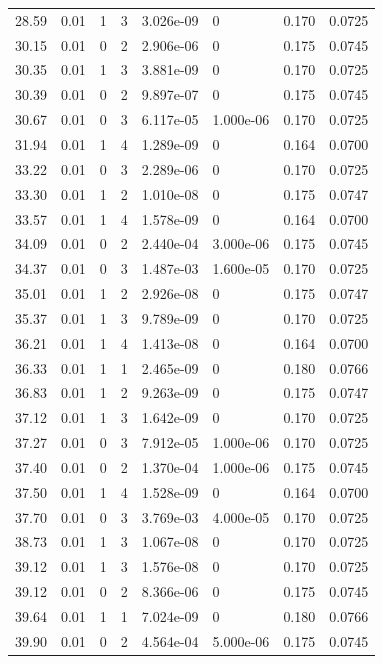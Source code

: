 \documentclass[preview]{standalone}
\begin{document}
{{{\begin{tabular}{L{1.2cm}C{1.2cm} C{0.3cm}C{0.5cm} C{1.4cm}C{1.4cm} C{1.4cm}C{1.4cm}}
  28.59  &  0.01  & 1     &  3 &  3.026e-09  & 0  & 0.170 &  0.0725   \\ 
  30.15  &  0.01  & 0     &  2 &  2.906e-06  & 0  & 0.175 &  0.0745   \\ 
  30.35  &  0.01  & 1     &  3 &  3.881e-09  & 0  & 0.170 &  0.0725   \\ 
  30.39  &  0.01  & 0     &  2 &  9.897e-07  & 0  & 0.175 &  0.0745   \\ 
  30.67  &  0.01  & 0     &  3 &  6.117e-05  & 1.000e-06  & 0.170 &  0.0725   \\ 
  31.94  &  0.01  & 1     &  4 &  1.289e-09  & 0  & 0.164 &  0.0700   \\ 
  33.22  &  0.01  & 0     &  3 &  2.289e-06  & 0  & 0.170 &  0.0725   \\ 
  33.30  &  0.01  & 1     &  2 &  1.010e-08  & 0  & 0.175 &  0.0747   \\ 
  33.57  &  0.01  & 1     &  4 &  1.578e-09  & 0  & 0.164 &  0.0700   \\ 
  34.09  &  0.01  & 0     &  2 &  2.440e-04  & 3.000e-06  & 0.175 &  0.0745   \\ 
  34.37  &  0.01  & 0     &  3 &  1.487e-03  & 1.600e-05  & 0.170 &  0.0725   \\ 
  35.01  &  0.01  & 1     &  2 &  2.926e-08  & 0  & 0.175 &  0.0747   \\ 
  35.37  &  0.01  & 1     &  3 &  9.789e-09  & 0  & 0.170 &  0.0725   \\ 
  36.21  &  0.01  & 1     &  4 &  1.413e-08  & 0  & 0.164 &  0.0700   \\ 
  36.33  &  0.01  & 1     &  1 &  2.465e-09  & 0  & 0.180 &  0.0766   \\ 
  36.83  &  0.01  & 1     &  2 &  9.263e-09  & 0  & 0.175 &  0.0747   \\ 
  37.12  &  0.01  & 1     &  3 &  1.642e-09  & 0  & 0.170 &  0.0725   \\ 
  37.27  &  0.01  & 0     &  3 &  7.912e-05  & 1.000e-06  & 0.170 &  0.0725   \\ 
  37.40  &  0.01  & 0     &  2 &  1.370e-04  & 1.000e-06  & 0.175 &  0.0745   \\ 
  37.50  &  0.01  & 1     &  4 &  1.528e-09  & 0  & 0.164 &  0.0700   \\ 
  37.70  &  0.01  & 0     &  3 &  3.769e-03  & 4.000e-05  & 0.170 &  0.0725   \\ 
  38.73  &  0.01  & 1     &  3 &  1.067e-08  & 0  & 0.170 &  0.0725   \\ 
  39.12  &  0.01  & 1     &  3 &  1.576e-08  & 0  & 0.170 &  0.0725   \\ 
  39.12  &  0.01  & 0     &  2 &  8.366e-06  & 0  & 0.175 &  0.0745   \\ 
  39.64  &  0.01  & 1     &  1 &  7.024e-09  & 0  & 0.180 &  0.0766   \\ 
  39.90  &  0.01  & 0     &  2 &  4.564e-04  & 5.000e-06  & 0.175 &  0.0745   \\ 
\hline 
\end{tabular} 

}}}
\end{document}
